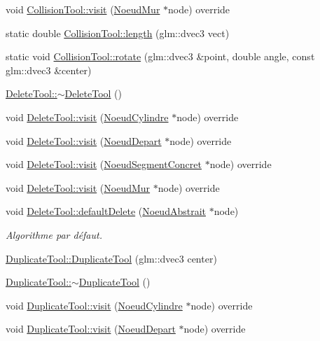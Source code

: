 \begin{DoxyCompactItemize}
void \hyperlink{group__inf2990_ga25177ba7c7bb3179b850f4b702906b38}{Collision\-Tool\-::visit} (\hyperlink{class_noeud_mur}{Noeud\-Mur} $\ast$node) override
\item 
static double \hyperlink{group__inf2990_gacde31d7d23d078dae0286e8f3088bb32}{Collision\-Tool\-::length} (glm\-::dvec3 vect)
\item 
static void \hyperlink{group__inf2990_gabf47107895dd5a494323f678fd430385}{Collision\-Tool\-::rotate} (glm\-::dvec3 \&point, double angle, const glm\-::dvec3 \&center)
\item 
\hyperlink{group__inf2990_ga4a54f710ae3ca5e4eb8e16610d07c3bc}{Delete\-Tool\-::$\sim$\-Delete\-Tool} ()
\item 
void \hyperlink{group__inf2990_gaf91f134881ce52596486855f405e8f96}{Delete\-Tool\-::visit} (\hyperlink{class_noeud_cylindre}{Noeud\-Cylindre} $\ast$node) override
\item 
void \hyperlink{group__inf2990_ga9efc126da05a809724a3a2597ac4cb57}{Delete\-Tool\-::visit} (\hyperlink{class_noeud_depart}{Noeud\-Depart} $\ast$node) override
\item 
void \hyperlink{group__inf2990_ga1908b4ee57bb2dfbf4022412b48470d8}{Delete\-Tool\-::visit} (\hyperlink{class_noeud_segment_concret}{Noeud\-Segment\-Concret} $\ast$node) override
\item 
void \hyperlink{group__inf2990_ga816147276bc393b0552e031441541726}{Delete\-Tool\-::visit} (\hyperlink{class_noeud_mur}{Noeud\-Mur} $\ast$node) override
\item 
void \hyperlink{group__inf2990_gab16541bc54ef7e060c56d59d64798805}{Delete\-Tool\-::default\-Delete} (\hyperlink{class_noeud_abstrait}{Noeud\-Abstrait} $\ast$node)
\begin{DoxyCompactList}\small\item\em Algorithme par défaut. \end{DoxyCompactList}\item 
\hyperlink{group__inf2990_ga13dd0524e005f4a44dbaeea9f237d761}{Duplicate\-Tool\-::\-Duplicate\-Tool} (glm\-::dvec3 center)
\item 
\hyperlink{group__inf2990_gaab141bc62b424e5e0bfc48bd899bcb8a}{Duplicate\-Tool\-::$\sim$\-Duplicate\-Tool} ()
\item 
void \hyperlink{group__inf2990_gab91de27487440694048c1a0fbcc74da7}{Duplicate\-Tool\-::visit} (\hyperlink{class_noeud_cylindre}{Noeud\-Cylindre} $\ast$node) override
\item 
void \hyperlink{group__inf2990_ga5fa8bbf01a90c95062c8104ebdf5bb62}{Duplicate\-Tool\-::visit} (\hyperlink{class_noeud_depart}{Noeud\-Depart} $\ast$node) override

\end{DoxyCompactItemize}
